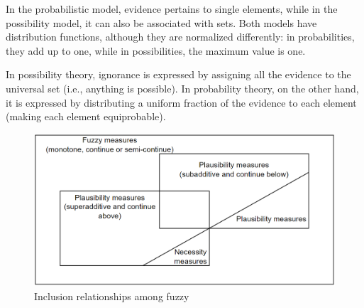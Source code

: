In the probabilistic model, evidence pertains to single elements, while in the possibility model, it can also be associated with sets. 
Both models have distribution functions, although they are normalized differently: in probabilities, they add up to one, while in possibilities, the maximum value is one.

In possibility theory, ignorance is expressed by assigning all the evidence to the universal set (i.e., anything is possible). 
In probability theory, on the other hand, it is expressed by distributing a uniform fraction of the evidence to each element (making each element equiprobable).
\begin{figure}[H]
    \centering
    \includegraphics[width=0.75\linewidth]{images/measures.png}
    \caption{Inclusion relationships among fuzzy}
\end{figure}